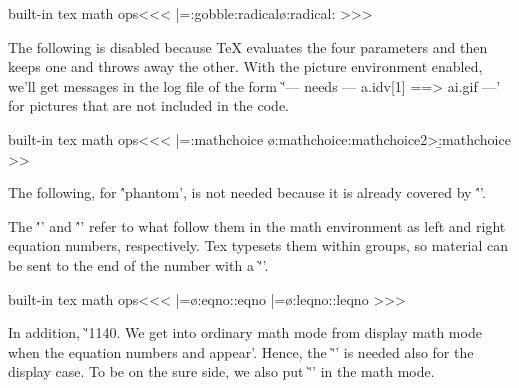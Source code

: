 {{{{{{{{\<built-in tex math ops\><<<
\def\:temp{\pic:gobble\a:radical\o:radical:}
\HLet\radical|=\:temp
>>>

\Verbatim
{}
\EndVerbatim



The following is disabled because \TeX{} evaluates the four parameters
and then keeps one and throws away the other.  With the picture
environment enabled, we'll get messages in the log file of the form
\`'--- needs --- a.idv[1] ==> ai.gif ---' for pictures that are not
included in the code.


\<built-in tex math ops\><<<
\def\:temp#1#2#3#4{\a:mathchoice
   \o:mathchoice:{#1}{#2}{#3}{#4}\b:mathchoice }
\HLet\mathchoice|=\:temp
\NewConfigure{mathchoice}{2}
>>>



The following, for \''\?phantom', is not needed because it is already
covered by \''\mathchoice'.

\Verbatim
\def\makeph@nt#1{\PictureOff
   \setbox\z@\hbox{#1}\finph@nt  \PictureOn}
\def\mathph@nt#1#2{\PictureOff
   \setbox\z@\hbox{$\m@th#1{#2}$}\finph@nt \PictureOn}
\EndVerbatim





The \''\eqno' and \''\leqno' refer to what follow them in the math
environment as left and right equation numbers, respectively. Tex
typesets them within groups, so material can be sent to the end of the 
number with a \`''.

\<built-in tex math ops\><<<
\def\:temp{\o:eqno:\a:eqno}
\HLet\eqno|=\:temp
\def\:temp{\o:leqno:\a:leqno}
\HLet\leqno|=\:temp
>>>






In addition, 
\`'1140. We get into ordinary math mode from display math mode when 
the equation numbers \eqno and \leqno appear'.
Hence, the \`'\everymath{}' is needed also for the display case.
To be on the sure side, we also put \`'\everydisplay{}' in the math mode.









}}}}}}}}
